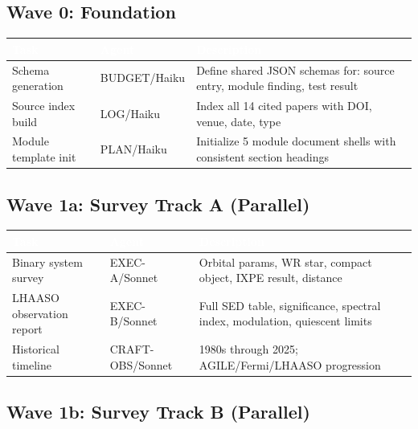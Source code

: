 \documentclass[11pt,letterpaper]{article}
\newcommand{\tableheader}[1]{\textbf{\sffamily\textcolor{white}{#1}}}
\begin{document}
\subsection{Wave 0: Foundation}

\begin{center}
\begin{tabularx}{\textwidth}{L{3.5cm}L{2cm}X}
\toprule
{}
\tableheader{Task} & \tableheader{Agent} & \tableheader{Description} \\
\midrule
Schema generation & BUDGET/Haiku & Define shared JSON schemas for: source entry, module finding, test result \\
Source index build & LOG/Haiku & Index all 14 cited papers with DOI, venue, date, type \\
Module template init & PLAN/Haiku & Initialize 5 module document shells with consistent section headings \\
\bottomrule
\end{tabularx}
\end{center}

\subsection{Wave 1a: Survey Track A (Parallel)}

\begin{center}
\begin{tabularx}{\textwidth}{L{3.5cm}L{2cm}X}
\toprule
{}
\tableheader{Task} & \tableheader{Agent} & \tableheader{Description} \\
\midrule
Binary system survey & EXEC-A/Sonnet & Orbital params, WR star, compact object, IXPE result, distance \\
LHAASO observation report & EXEC-B/Sonnet & Full SED table, significance, spectral index, modulation, quiescent limits \\
Historical timeline & CRAFT-OBS/Sonnet & 1980s through 2025; AGILE/Fermi/LHAASO progression \\
\bottomrule
\end{tabularx}
\end{center}

\subsection{Wave 1b: Survey Track B (Parallel)}
\end{document}
